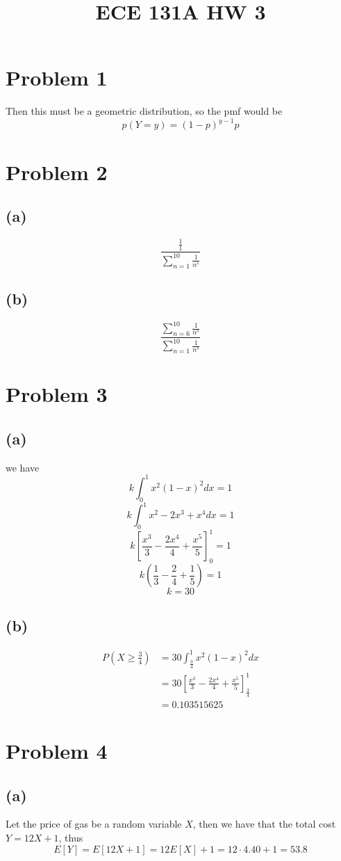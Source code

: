
\title{ECE 131A HW 3}

\maketitle
\section*{Problem 1}
Then this must be a geometric distribution, so the pmf would be 
$$p(Y=y)=(1-p)^{y-1}p$$
\section*{Problem 2}
\subsection*{(a)}
$$\boxed{\frac{\frac{1}{1}}{\sum_{n=1}^{10}\frac{1}{n^s}}}$$
\subsection*{(b)}
$$\boxed{\frac{\sum_{n=6}^{10}\frac{1}{n^s}}{\sum_{n=1}^{10}\frac{1}{n^s}}}$$
\section*{Problem 3}
\subsection*{(a)}
we have
$$k\int_{0}^{1}x^2(1-x)^2dx=1$$
$$k\int_{0}^{1}x^2-2x^3+x^4dx=1$$
$$k\left[\frac{x^3}{3}-\frac{2x^4}{4}+\frac{x^5}{5}\right]_{0}^{1}=1$$
$$k\left(\frac{1}{3}-\frac{2}{4}+\frac{1}{5}\right)=1$$
$$\boxed{k=30}$$
\subsection*{(b)}
\begin{align*}
    P(X\geq \frac{3}{4})&=30\int_{\frac{3}{4}}^{1}x^2(1-x)^2dx\\
    &=30\left[\frac{x^3}{3}-\frac{2x^4}{4}+\frac{x^5}{5}\right]_{\frac{3}{4}}^{1}\\
    &=\boxed{0.103515625}
\end{align*}
\section*{Problem 4}
\subsection*{(a)}
Let the price of gas be a random variable $X$, then we have that the
total cost $Y=12X+1$, thus
$$E[Y]=E[12X+1]=12E[X]+1=12\cdot4.40+1=\boxed{53.8}$$
